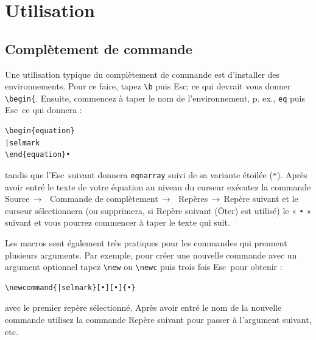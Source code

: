 \documentclass[11pt,french]{article}
\newcommand{\optkey}{\textsf{Opt}}
\newcommand{\ctlkey}{\textsf{Ctl}}
\newcommand{\cmdkey}{\textsf{Cmd}}
\newcommand{\esckey}{\textsf{Esc}}
\newcommand{\mnu}[1]{\textsf{#1}}
\newcommand{\To}{\,\(\to\)\,}
\newcommand{\TS}{\textsf{\TeX Shop}}
\begin{document}

\section*{Utilisation}

\subsection*{Complètement de commande}

Une utilisation typique du complètement de commande est d'installer des environnements. Pour ce faire, tapez 
\verb|\b| puis \esckey ; ce qui devrait vous donner \verb|\begin{|. Ensuite, commencez à taper le nom de l'environnement, p. ex., \verb|eq| puis \esckey\ ce qui donnera : 
\begin{verbatim}
\begin{equation}
|selmark
\end{equation}•
\end{verbatim}
tandis que l'\esckey\ suivant donnera \texttt{eqnarray} suivi de sa variante étoilée (\texttt{*}). Après avoir entré le 
texte de votre équation au niveau du curseur exécutez la commande \mnu{Source}\To\ \mnu{Commande de complètement}\To\ \mnu{Repères}\To\mnu{Repère suivant} et le curseur sélectionnera (ou supprimera, si \mnu{Repère suivant 
(Ôter)} est utilisé) le « \texttt{•} » suivant et vous pourrez commencer à taper le texte qui suit.

Les macros sont également très pratiques pour les commandes qui prennent plusieurs arguments. Par exemple, 
pour créer une nouvelle commande avec un argument optionnel tapez \verb|\new| ou \verb|\newc| puis trois fois \esckey\ pour obtenir : 
\begin{verbatim}
\newcommand{|selmark}[•][•]{•}
\end{verbatim}
avec le premier repère sélectionné. Après avoir entré le nom de la nouvelle commande utilisez la 
commande \mnu{Repère suivant} pour passer à l'argument suivant, etc.
\end{document}
